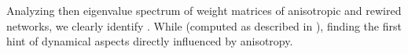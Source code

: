 Analyzing then eigenvalue spectrum of weight matrices of anisotropic
and rewired networks, we clearly identify . While (computed as
described in \textcite{Rajan2006}), finding the first hint of
dynamical aspects directly influenced by anisotropy.







